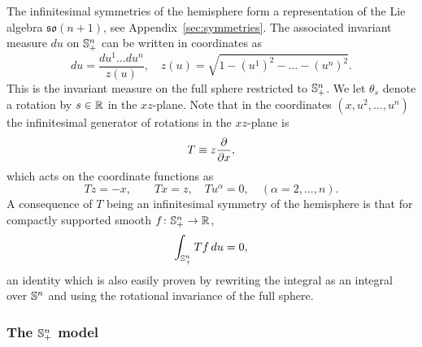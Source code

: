 \documentclass[11pt,a4paper]{article}
\begin{document}
The infinitesimal symmetries of the hemisphere form a representation
of the Lie algebra $\mathfrak{so}(n+1)$, see
Appendix~\ref{sec:symmetries}. 
The associated invariant measure $du$ on ${\mathbb S}^{n}_+$ can be written
in coordinates as
\begin{equation}
  \label{eq:Sn-haar}
  du = \frac{du^{1}\dots du^{n}}{z(u)}, \quad z(u) = 
  \sqrt{1- (u^{1})^{2} - \dots - (u^{n})^{2}}.
\end{equation}
This is the invariant measure on the full sphere
restricted to ${\mathbb S}^{n}_{+}$. We let $\theta_{s}$ denote a rotation by $s\in\mathbb{R}$ in the
$xz$-plane. Note that in the coordinates $(x,u^{2},\dots, u^{n})$
the infinitesimal generator of rotations in the $xz$-plane is
\begin{equation}
  \label{eq:Sn-Inf1}
  T \equiv z\frac{\partial }{\partial x}, 
\end{equation}
which acts on the coordinate functions as
\begin{equation}
  \label{eq:Sn-Inf}
  Tz = -x,\qquad T x= z,  
  \quad Tu^{\alpha} = 0, \quad (\alpha =2,\dots, n).
\end{equation}
A consequence of $T$ being an infinitesimal symmetry of the
hemisphere is that for compactly supported smooth $f\colon
{\ensuremath{\mathbb S}}^{n}_{+}\to \mathbb{R}$,
\begin{equation}
  \label{eq:IBP-hem}
  \int_{{\mathbb S}^{n}_{+}}Tf\, du = 0,
\end{equation}
an identity which is also easily proven by rewriting the integral as
an integral over ${\mathbb S}^{n}$ and using the rotational invariance of the
full sphere.


\subsubsection{The ${\mathbb S}^{n}_{+}$ model}
\label{sec:hemisph-spin-model-1}
\end{document}
